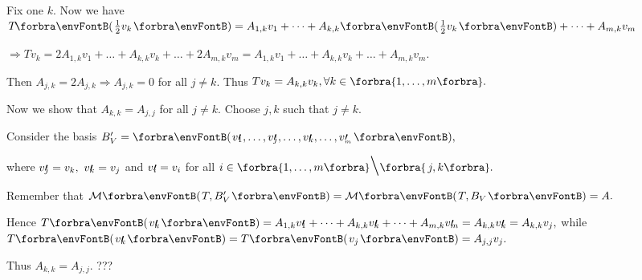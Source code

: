 Fix one $k.$ Now we have $T\!\Par{\frac{1}{2}v_k}=A_{1,k}v_1+\dots+A_{k,k}\Par{\frac{1}{2}v_k}+\dots+A_{m,k}v_m$\vspace{3pt}\par\quad
$\Rightarrow Tv_k=2A_{1,k}v_1+\dots+A_{k,k}v_k+\dots+2A_{m,k}v_m=A_{1,k}v_1+\dots+A_{k,k}v_k+\dots+A_{m,k}v_m.$\vspace{3pt}\par\quad
Then $A_{j,k}=2A_{j,k}\Rightarrow A_{j,k}=0$ for all $j\neq k.$ Thus $Tv_k=A_{k,k}v_k,\forall k\in\Bra{1,\dots,m}.$\vspace{3pt}\par\quad
Now we show that $A_{k,k}=A_{j,j}$ for all $j\neq k.$ Choose $j,k$ such that $j\neq k.$\vspace{3pt}\par\quad
Consider the basis $B_V'=\Par{v\apostrophe{\hspace{-3pt}_1},\dots,v\apostrophe{\hspace{-3pt}_j},\dots,v\apostrophe{\hspace{-3pt}_k},\dots,v\apostrophe_{\hspace{-3pt}_m}},$\vspace{3pt}\par\qquad\qquad\quad\hspace{1pt}
where $v\prime{\hspace{-3pt}_j}=v_k,\,\,v\prime{\hspace{-3pt}_k}=v_j$ and $v\prime{\hspace{-3pt}_i}=v_i$ for all $i\in\Bra{1,\dots,m}\Backslash[\LARGE]\Bra{\,j,k}.$\vspace{3pt}\par\quad
Remember that $\Mt{T,B_V'}=\Mt{T,B_V}=A.$\vspace{3pt}\par\quad
Hence $T\Par{v\apostrophe{\hspace{-3pt}_k}}=A_{1,k}v\apostrophe{\hspace{-3pt}_1}+\dots+A_{k,k}v\apostrophe{\hspace{-3pt}_k}+\dots+A_{m,k}v\apostrophe{\hspace{-3pt}_m}=A_{k,k}v\apostrophe{\hspace{-3pt}_k}=A_{k,k}v_j,$ while $T\Par{v\apostrophe{\hspace{-3pt}_k}}=T\Par{v_j}=A_{j,j}v_j.$\vspace{3pt}\par\quad
Thus $A_{k,k}=A_{j,j}.$\PfEnd\vspace{10pt}\quad
\Or ??? \par
\SepLine\pagebreak

